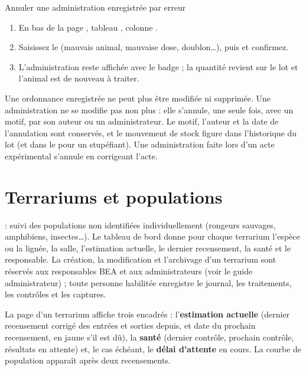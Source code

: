 \documentclass[11pt,a4paper]{article}
\begin{document}
\begin{procedure}{Annuler une administration enregistrée par erreur}
\begin{enumerate}
  \item En bas de la page , tableau , colonne .
  \item Saisissez le  (mauvais animal, mauvaise dose, doublon…),
    puis  et confirmez.
  \item L'administration reste affichée avec le badge  ; la quantité revient sur le lot et l'animal est
    de nouveau à traiter.
\end{enumerate}
\end{procedure}
\begin{trace}
Une ordonnance enregistrée ne peut plus être modifiée ni supprimée. Une
administration ne se modifie pas non plus : elle s'annule, une seule fois,
avec un motif, par son auteur ou un administrateur. Le motif, l'auteur et la
date de l'annulation sont conservés, et le mouvement de stock figure dans
l'historique du lot (et dans le  pour un
stupéfiant). Une administration faite lors d'un acte expérimental s'annule
en corrigeant l'acte.
\end{trace}

\section{Terrariums et populations}\label{sec:terrariums}
 : suivi des populations non
identifiées individuellement (rongeurs sauvages, amphibiens, insectes…). Le
tableau de bord donne pour chaque terrarium l'espèce ou la lignée, la salle,
l'estimation actuelle, le dernier recensement, la santé et le responsable.
La création, la modification et l'archivage d'un terrarium sont réservés aux
responsables BEA et aux administrateurs (voir le guide administrateur) ; toute personne habilitée enregistre le journal,
les traitements, les contrôles et les captures.


La page d'un terrarium affiche trois encadrés : l'\textbf{estimation
actuelle} (dernier recensement corrigé des entrées et sorties depuis, et date
du prochain recensement, en jaune s'il est dû), la \textbf{santé} (dernier
contrôle, prochain contrôle, résultats en attente) et, le cas échéant, le
\textbf{délai d'attente} en cours. La courbe de population apparaît après
deux recensements.
\end{document}
